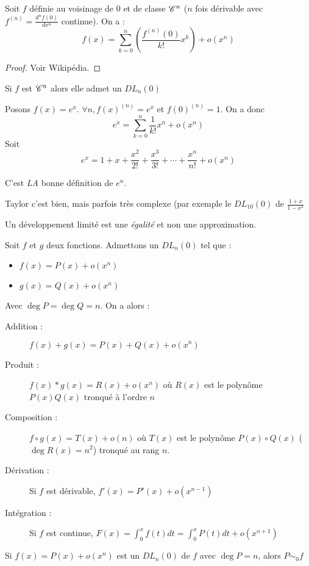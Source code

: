 \begin{thm}
Soit $f$ définie au voisinage de 0 et de classe $\mathscr{C}^n$ ($n$ fois dérivable avec $f^{(n)}=\frac{d^nf(0)}{dx^n}$ continue). On a :
$$f(x)=\sum_{k=0}^n{\left(\frac{f^{(n)}(0)}{k!}x^k\right)}+o(x^n)$$
\end{thm}

\begin{proof}Voir Wikipédia.\end{proof}


\begin{coro}
Si $f$ est $\mathscr{C}^n$ alors elle admet un $DL_n(0)$
\end{coro}
\begin{expl}
Posons $f(x)=e^x$. $\forall n,f(x)^{(n)} = e^x$ et $f(0)^{(n)} = 1$. On a donc
$$e^x = \sum_{k=0}^n{\frac{1}{k!}x^n}+o(x^n)$$
Soit
\[e^x=1+x+\frac{x^2}{2!}+\frac{x^3}{3!}+\cdots+\frac{x^n}{n!}+o(x^n)\]
\end{expl}

\begin{rem}
C'est \emph{LA} bonne définition de $e^n$.
\end{rem}

\begin{expl}\end{expl}

\begin{rem}
Taylor c'est bien, mais parfois très complexe (par exemple le $DL_{10}(0)$ de $\frac{1+x}{1-x^2}$
\end{rem}

\begin{rem}
Un développement limité est une \emph{égalité} et non une approximation.
\end{rem}

\begin{prop}
Soit $f$ et $g$ deux fonctions. Admettons un $DL_n(0)$ tel que :
\begin{itemize}
	\item $f(x)=P(x)+o(x^n)$
	\item $g(x)=Q(x)+o(x^n)$
\end{itemize}
Avec $\deg P =\deg Q=n$. On a alors :
\begin{description}
	\item[Addition :]$f(x) + g(x) = P(x) + Q(x) + o(x^n)$
	\item[Produit :]$f(x) * g(x) = R(x) + o(x^n)$ où $R(x)$ est le polynôme $P(x)Q(x)$ tronqué à l'ordre $n$
	\item[Composition :]$f\circ g(x) = T(x) + o(n)$ où $T(x)$ est le polynôme $P(x)\circ Q(x)$ ($\deg R(x) = n^2$) tronqué au rang $n$.
	\item[Dérivation :] Si $f$ est dérivable, $f'(x) = P'(x) + o(x^{n-1})$
	\item[Intégration :]Si $f$ est continue, $F(x) = \int_0^x{f(t) dt} =\int_0^x{P(t)dt}+o(x^{n+1})$
\end{description}
\end{prop}

\begin{prop}
Si $f(x) = P(x)+o(x^n)$ est un $DL_n(0)$ de $f$ avec $\deg P=n$, alors $P \sim_0 f$
\end{prop}
